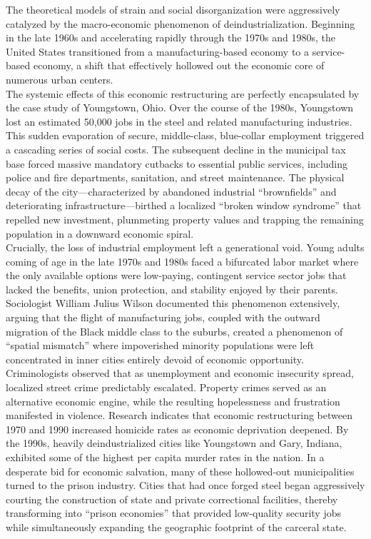 \documentclass[
]{article}
\begin{document}
The theoretical models of strain and social disorganization were
aggressively catalyzed by the macro-economic phenomenon of
deindustrialization. Beginning in the late 1960s and accelerating
rapidly through the 1970s and 1980s, the United States transitioned from
a manufacturing-based economy to a service-based economy, a shift that
effectively hollowed out the economic core of numerous urban centers.\\
The systemic effects of this economic restructuring are perfectly
encapsulated by the case study of Youngstown, Ohio. Over the course of
the 1980s, Youngstown lost an estimated 50,000 jobs in the steel and
related manufacturing industries. This sudden evaporation of secure,
middle-class, blue-collar employment triggered a cascading series of
social costs. The subsequent decline in the municipal tax base forced
massive mandatory cutbacks to essential public services, including
police and fire departments, sanitation, and street maintenance. The
physical decay of the city---characterized by abandoned industrial
``brownfields'' and deteriorating infrastructure---birthed a localized
``broken window syndrome'' that repelled new investment, plummeting
property values and trapping the remaining population in a downward
economic spiral.\\
Crucially, the loss of industrial employment left a generational void.
Young adults coming of age in the late 1970s and 1980s faced a
bifurcated labor market where the only available options were
low-paying, contingent service sector jobs that lacked the benefits,
union protection, and stability enjoyed by their parents. Sociologist
William Julius Wilson documented this phenomenon extensively, arguing
that the flight of manufacturing jobs, coupled with the outward
migration of the Black middle class to the suburbs, created a phenomenon
of ``spatial mismatch'' where impoverished minority populations were
left concentrated in inner cities entirely devoid of economic
opportunity.\\
Criminologists observed that as unemployment and economic insecurity
spread, localized street crime predictably escalated. Property crimes
served as an alternative economic engine, while the resulting
hopelessness and frustration manifested in violence. Research indicates
that economic restructuring between 1970 and 1990 increased homicide
rates as economic deprivation deepened. By the 1990s, heavily
deindustrialized cities like Youngstown and Gary, Indiana, exhibited
some of the highest per capita murder rates in the nation. In a
desperate bid for economic salvation, many of these hollowed-out
municipalities turned to the prison industry. Cities that had once
forged steel began aggressively courting the construction of state and
private correctional facilities, thereby transforming into ``prison
economies'' that provided low-quality security jobs while simultaneously
expanding the geographic footprint of the carceral state.
\end{document}
